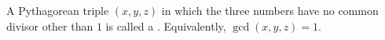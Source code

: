 A Pythagorean triple $(x, y, z)$ in which the three numbers have no common divisor other than $1$ is called a . Equivalently, $\gcd(x, y, z) = 1$.
